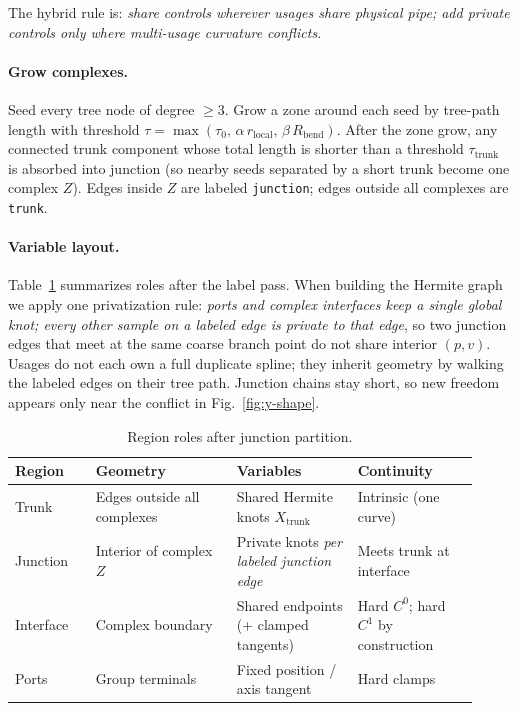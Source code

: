 The hybrid rule is: \emph{share controls wherever usages share physical pipe;
add private controls only where multi-usage curvature conflicts}.

\paragraph{Grow complexes.}
Seed every tree node of degree $\ge 3$.
Grow a zone around each seed by tree-path length with threshold
$\tau=\max(\tau_0,\,\alpha\,r_{\mathrm{local}},\,\beta\,R_{\mathrm{bend}})$.
After the zone grow, any connected trunk component whose total length is shorter
than a threshold $\tau_{\mathrm{trunk}}$ is absorbed into junction (so nearby
seeds separated by a short trunk become one complex $Z$).
Edges inside $Z$ are labeled \texttt{junction}; edges outside all complexes are
\texttt{trunk}.

\paragraph{Variable layout.}
Table~\ref{tab:regions} summarizes roles after the label pass.
When building the Hermite graph we apply one privatization rule:
\emph{ports and complex interfaces keep a single global knot; every other
sample on a labeled edge is private to that edge}, so two junction edges that
meet at the same coarse branch point do not share interior $(p,v)$.
Usages do not each own a full duplicate spline; they inherit geometry by
walking the labeled edges on their tree path.
Junction chains stay short, so new freedom appears only near the conflict in
Fig.~\ref{fig:y-shape}.

\begin{table}[H]
  \centering
  \caption{Region roles after junction partition.}
  \label{tab:regions}
  \begin{tabular}{@{}p{0.16\linewidth}p{0.28\linewidth}p{0.24\linewidth}p{0.24\linewidth}@{}}
    \toprule
    Region & Geometry & Variables & Continuity \\
    \midrule
    Trunk
      & Edges outside all complexes
      & Shared Hermite knots $X_{\mathrm{trunk}}$
      & Intrinsic (one curve) \\
    Junction
      & Interior of complex $Z$
      & Private knots \emph{per labeled junction edge}
      & Meets trunk at interface \\
    Interface
      & Complex boundary
      & Shared endpoints (+ clamped tangents)
      & Hard $C^{0}$; hard $C^{1}$ by construction \\
    Ports
      & Group terminals
      & Fixed position / axis tangent
      & Hard clamps \\
    \bottomrule
  \end{tabular}
\end{table}

